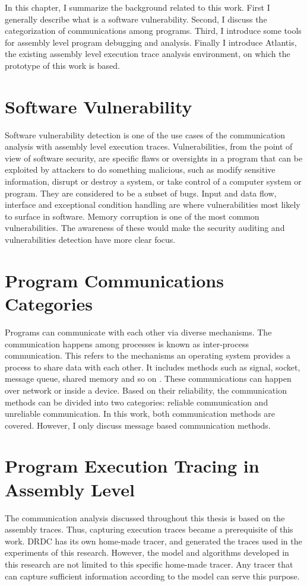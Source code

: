 \label{chapter:Bac}
In this chapter, I summarize the background related to this work. First I generally describe what is a software vulnerability. Second, I discuss the categorization of communications among programs. Third, I introduce some tools for assembly level program debugging and analysis. Finally I introduce Atlantis, the existing assembly level execution trace analysis environment, on which the prototype of this work is based.

\section{Software Vulnerability}
Software vulnerability detection is one of the use cases of the communication analysis with assembly level execution traces. Vulnerabilities, from the point of view of software security, are specific flaws or oversights in a program that can be exploited by attackers to do something malicious, such as modify sensitive information, disrupt or destroy a system, or take control of a computer system or program\cite{dowd_art_2006}. They are considered to be a subset of bugs. Input and data flow, interface and exceptional condition handling are where vulnerabilities most likely to surface in software. Memory corruption is one of the most common vulnerabilities. The awareness of these would make the security auditing and vulnerabilities detection have more clear focus. 

\section{Program Communications Categories}
Programs can communicate with each other via diverse mechanisms. The communication happens among processes is known as inter-process communication. This refers to the mechanisms an operating system provides a process to share data with each other. It includes methods such as signal, socket, message queue, shared memory and so on \cite{garrido2000inter}. These communications can happen over network or inside a device. Based on their reliability, the communication methods can be divided into two categories: reliable communication and unreliable communication. In this work, both communication methods are covered. However, I only discuss message based communication methods.

\section{Program Execution Tracing in Assembly Level}
The communication analysis discussed throughout this thesis is based on the assembly traces. Thus, capturing execution traces became a prerequisite of this work. DRDC has its own home-made tracer, and generated the traces used in the experiments of this research. However, the model and algorithms developed in this research are not limited to this specific home-made tracer. Any tracer that can capture sufficient information according to the model can serve this purpose.

